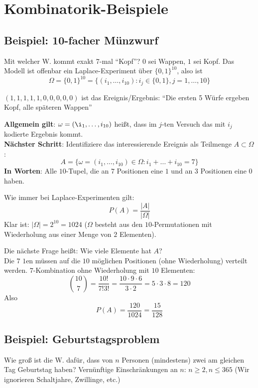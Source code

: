 \section{Kombinatorik-Beispiele}

\subsection{Beispiel: 10-facher Münzwurf}

Mit welcher W. kommt exakt 7-mal ``Kopf''?
$0$ sei Wappen, $1$ sei Kopf.
Das Modell ist offenbar ein Laplace-Experiment über $\{0,1\}^{10}$, also ist 
\[\Omega=\{0,1\}^{10} = \{ (i_1,\ldots,i_{10}) : i_j \in \{0,1\}, j = 1,\ldots,10 \}\]

$(1,1,1,1,1,0,0,0,0,0)$ ist das Ereignis/Ergebnis: ``Die ersten 5 Würfe ergeben Kopf, alle späteren Wappen''

\noindent \textbf{Allgemein gilt}: 
$\omega = (\i_1,\ldots,i_{10})$ heißt, dass im $j$-ten Versuch das mit $i_j$ kodierte Ergebnis kommt.\\
\textbf{Nächster Schritt}:
Identifiziere das interessierende Ereignis als Teilmenge $A \subset \Omega$:
\[ A = \{ \omega=(i_1,\ldots,i_{10}) \in \Omega : i_1+\ldots + i_{10} = 7 \} \]
\textbf{In Worten}:
Alle $10$-Tupel, die an $7$ Positionen eine $1$ und an $3$ Positionen eine $0$ haben.

\noindent Wie immer bei Laplace-Experimenten gilt: 
\[P(A) = \frac{|A|}{|\Omega|} \]
Klar ist: $|\Omega| = 2^{10} = 1024$ ($\Omega$ besteht aus den $10$-Permutationen mit Wiederholung aus einer Menge von $2$ Elementen).

\noindent Die nächste Frage heißt: 
Wie viele Elemente hat $A$?\\
Die $7$ $1$en müssen auf die $10$ möglichen Positionen (ohne Wiederholung) verteilt werden.
$7$-Kombination ohne Wiederholung mit $10$ Elementen:
\[ {10 \choose 7} = \frac{10!}{7!3!} = \frac{10\cdot 9 \cdot 6}{3 \cdot 2} = 5 \cdot 3 \cdot 8 = 120 \]
Also \[ P(A) = \frac{120}{1024} = \frac{15}{128} \]

\subsection{Beispiel: Geburtstagsproblem}

Wie groß ist die W. dafür, dass von $n$ Personen (mindestens) zwei am gleichen Tag Geburtstag haben?
Vernünftige Einschränkungen an $n$: $n \geq 2, n \leq 365$ (Wir ignorieren Schaltjahre, Zwillinge, etc.)

